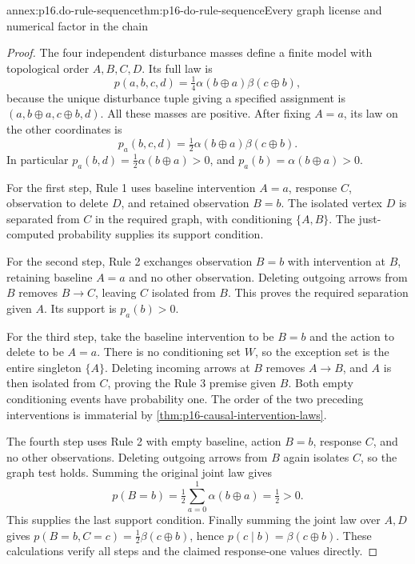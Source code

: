 \begin{annexitem}{annex:p16.do-rule-sequence}{thm:p16-do-rule-sequence}{Every graph license and numerical factor in the chain}
\begin{proof}
The four independent disturbance masses define a finite model with
topological order \(A,B,C,D\). Its full law is
\[
 p(a,b,c,d)=\tfrac14\alpha(b\oplus a)\beta(c\oplus b),
\]
because the unique disturbance tuple giving a specified assignment is
\((a,b\oplus a,c\oplus b,d)\). All these masses are positive.
After fixing \(A=a\), its law on the other coordinates is
\[
 p_a(b,c,d)=\tfrac12\alpha(b\oplus a)\beta(c\oplus b).
\]
In particular \(p_a(b,d)=\frac12\alpha(b\oplus a)>0\),
and \(p_a(b)=\alpha(b\oplus a)>0\).

For the first step, Rule 1 uses baseline intervention \(A=a\),
response \(C\), observation to delete \(D\), and retained
observation \(B=b\). The isolated vertex \(D\) is separated
from \(C\) in the required graph, with conditioning \(\{A,B\}\).
The just-computed probability supplies its support condition.

For the second step, Rule 2 exchanges observation \(B=b\) with
intervention at \(B\), retaining baseline \(A=a\) and no
other observation. Deleting outgoing arrows from \(B\) removes
\(B\to C\), leaving \(C\) isolated from \(B\). This proves
the required separation given \(A\). Its support is \(p_a(b)>0\).

For the third step, take the baseline intervention to be \(B=b\)
and the action to delete to be \(A=a\). There is no conditioning
set \(W\), so the exception set is the entire singleton \(\{A\}\).
Deleting incoming arrows at \(B\) removes \(A\to B\), and
\(A\) is then isolated from \(C\), proving the Rule 3 premise
given \(B\). Both empty conditioning events have probability one.
The order of the two preceding interventions is immaterial by
\cref{thm:p16-causal-intervention-laws}.

The fourth step uses Rule 2 with empty baseline, action \(B=b\),
response \(C\), and no other observations. Deleting outgoing
arrows from \(B\) again isolates \(C\), so the graph test holds.
Summing the original joint law gives
\[
 p(B=b)=\tfrac12\sum_{a=0}^1\alpha(b\oplus a)=\tfrac12>0.
\]
This supplies the last support condition. Finally summing the joint
law over \(A,D\) gives
\(p(B=b,C=c)=\frac12\beta(c\oplus b)\), hence
\(p(c\mid b)=\beta(c\oplus b)\). These calculations verify
all steps and the claimed response-one values directly.
\end{proof}
\end{annexitem}

